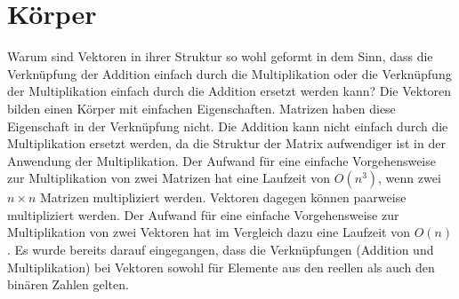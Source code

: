 \documentclass{report}
\numberwithin{equation}{section}
\begin{document}
\section{Körper}
Warum sind Vektoren in ihrer Struktur so wohl geformt in dem Sinn, dass die Verknüpfung der Addition einfach durch die Multiplikation oder die Verknüpfung der Multiplikation einfach durch die Addition ersetzt werden kann? Die Vektoren bilden einen Körper mit einfachen Eigenschaften. Matrizen haben diese Eigenschaft in der Verknüpfung nicht. Die Addition kann nicht einfach durch die Multiplikation ersetzt werden, da die Struktur der Matrix aufwendiger ist in der Anwendung der Multiplikation. Der Aufwand für eine einfache Vorgehensweise zur Multiplikation von zwei Matrizen hat eine Laufzeit von $O(n^3)$, wenn zwei $n \times n$ Matrizen multipliziert werden. Vektoren dagegen können paarweise multipliziert werden. Der Aufwand für eine einfache Vorgehensweise zur Multiplikation von zwei Vektoren hat im Vergleich dazu eine Laufzeit von $O(n)$. Es wurde bereits darauf eingegangen, dass die Verknüpfungen (Addition und Multiplikation) bei Vektoren sowohl für Elemente aus den reellen als auch den binären Zahlen gelten.
\end{document}
